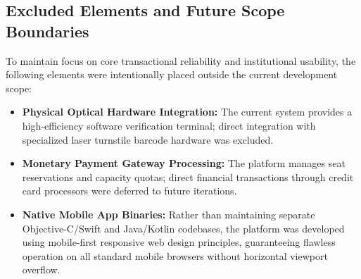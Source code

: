 \documentclass[11pt,a4paper]{report}
\begin{document}
\subsection{Excluded Elements and Future Scope Boundaries}
To maintain focus on core transactional reliability and institutional usability, the following elements were intentionally placed outside the current development scope:
\begin{itemize}[leftmargin=1.5em, itemsep=0.4em]
    \item \textbf{Physical Optical Hardware Integration:} The current system provides a high-efficiency software verification terminal; direct integration with specialized laser turnstile barcode hardware was excluded.
    \item \textbf{Monetary Payment Gateway Processing:} The platform manages seat reservations and capacity quotas; direct financial transactions through credit card processors were deferred to future iterations.
    \item \textbf{Native Mobile App Binaries:} Rather than maintaining separate Objective-C/Swift and Java/Kotlin codebases, the platform was developed using mobile-first responsive web design principles, guaranteeing flawless operation on all standard mobile browsers without horizontal viewport overflow.
\end{itemize}
\end{document}

